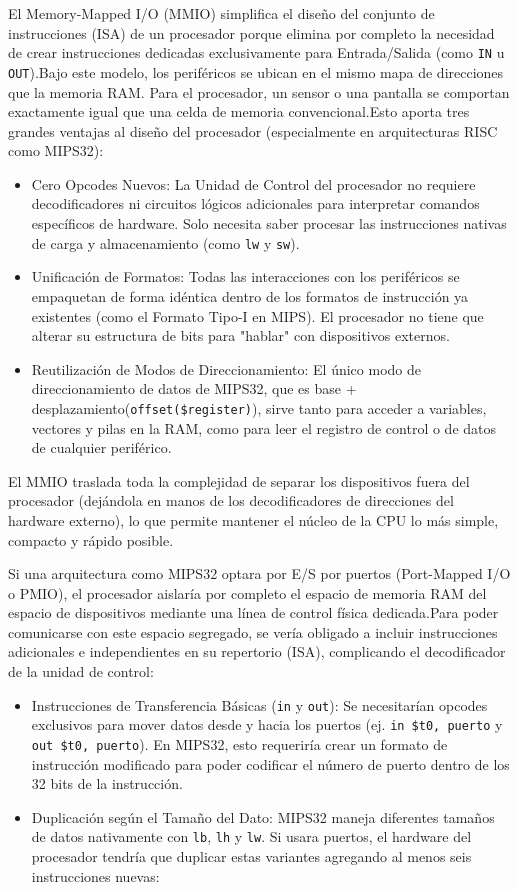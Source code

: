 \documentclass{article}
\begin{document}
El Memory-Mapped I/O (MMIO) simplifica el diseño del conjunto de instrucciones (ISA) de un procesador porque elimina por completo la necesidad de crear instrucciones dedicadas exclusivamente para Entrada/Salida (como \verb|IN| u \verb|OUT|).Bajo este modelo, los periféricos se ubican en el mismo mapa de direcciones que la memoria RAM. Para el procesador, un sensor o una pantalla se comportan exactamente igual que una celda de memoria convencional.Esto aporta tres grandes ventajas al diseño del procesador (especialmente en arquitecturas RISC como MIPS32):

\begin{itemize}
    \item Cero Opcodes Nuevos: La Unidad de Control del procesador no requiere decodificadores ni circuitos lógicos adicionales para interpretar comandos específicos de hardware. Solo necesita saber procesar las instrucciones nativas de carga y almacenamiento (como \verb|lw| y \verb|sw|).
    \item Unificación de Formatos: Todas las interacciones con los periféricos se empaquetan de forma idéntica dentro de los formatos de instrucción ya existentes (como el Formato Tipo-I en MIPS). El procesador no tiene que alterar su estructura de bits para "hablar" con dispositivos externos.
    \item Reutilización de Modos de Direccionamiento: El único modo de direccionamiento de datos de MIPS32, que es base + desplazamiento(\verb|offset($register)|), sirve tanto para acceder a variables, vectores y pilas en la RAM, como para leer el registro de control o de datos de cualquier periférico.
\end{itemize}

El MMIO traslada toda la complejidad de separar los dispositivos fuera del procesador (dejándola en manos de los decodificadores de direcciones del hardware externo), lo que permite mantener el núcleo de la CPU lo más simple, compacto y rápido posible.

Si una arquitectura como MIPS32 optara por E/S por puertos (Port-Mapped I/O o PMIO), el procesador aislaría por completo el espacio de memoria RAM del espacio de dispositivos mediante una línea de control física dedicada.Para poder comunicarse con este espacio segregado, se vería obligado a incluir instrucciones adicionales e independientes en su repertorio (ISA), complicando el decodificador de la unidad de control:

\begin{itemize}
    \item Instrucciones de Transferencia Básicas (\verb|in| y \verb|out|): Se necesitarían opcodes exclusivos para mover datos desde y hacia los puertos (ej. \verb|in $t0, puerto| y \verb|out $t0, puerto|). En MIPS32, esto requeriría crear un formato de instrucción modificado para poder codificar el número de puerto dentro de los 32 bits de la instrucción.
    \item Duplicación según el Tamaño del Dato: MIPS32 maneja diferentes tamaños de datos nativamente con \verb|lb|, \verb|lh| y \verb|lw|. Si usara puertos, el hardware del procesador tendría que duplicar estas variantes agregando al menos seis instrucciones nuevas:
\end{itemize}
\end{document}
